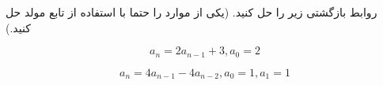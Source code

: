 \exercise
روابط بازگشتی زیر را حل کنید. (یکی از موارد را حتما با استفاده از تابع مولد حل کنید.)

$$a_n = 2a_{n-1} + 3, a_0 = 2$$

$$a_n = 4a_{n-1} - 4a_{n-2}, a_0 = 1, a_1 = 1$$